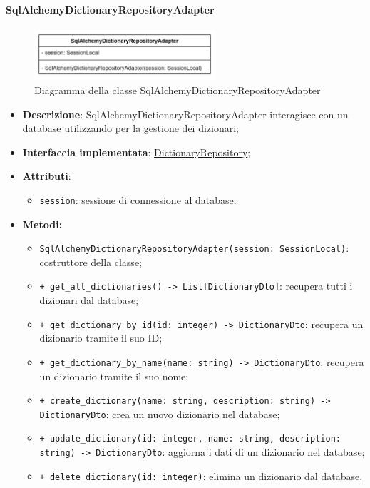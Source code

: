 \paragraph{SqlAlchemyDictionaryRepositoryAdapter} \label{SqlAlchemyDictionaryRepositoryAdapter}
\begin{figure}[H]
    \centering
    \includegraphics[width=0.6\textwidth]{assets/Backend/sql_alchemy_dictionary_repository_adapter.png}
    \caption{Diagramma della classe SqlAlchemyDictionaryRepositoryAdapter}
  \end{figure}
\begin{itemize}
    \item \textbf{Descrizione}: SqlAlchemyDictionaryRepositoryAdapter interagisce con un database utilizzando  per la gestione dei dizionari;
    \item \textbf{Interfaccia implementata}: \hyperref[DictionaryRepository]{DictionaryRepository};
    \item \textbf{Attributi}:
    \begin{itemize}
        \item \texttt{session}: sessione di connessione al database.
    \end{itemize}
    \item \textbf{Metodi:}
    \begin{itemize}
        \item \texttt{SqlAlchemyDictionaryRepositoryAdapter(session: SessionLocal)}: costruttore della classe;
        \item \texttt{+ get\_all\_dictionaries() -> List[DictionaryDto]}: recupera tutti i dizionari dal database;
        \item \texttt{+ get\_dictionary\_by\_id(id: integer) -> DictionaryDto}: recupera un dizionario tramite il suo ID;
        \item \texttt{+ get\_dictionary\_by\_name(name: string) -> DictionaryDto}: recupera un dizionario tramite il suo nome;
        \item \texttt{+ create\_dictionary(name: string, description: string) -> DictionaryDto}: crea un nuovo dizionario nel database;
        \item \texttt{+ update\_dictionary(id: integer, name: string, description: string) -> DictionaryDto}: aggiorna i dati di un dizionario nel database;
        \item \texttt{+ delete\_dictionary(id: integer)}: elimina un dizionario dal database.
    \end{itemize}
\end{itemize} 

